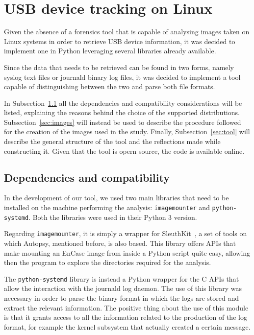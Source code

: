 \documentclass[a4paper,twocolumn]{article}
\begin{document}
\section{USB device tracking on Linux}
\label{sec:contrib}
Given the absence of a forensics tool that is capable of analysing images taken
on Linux systems in order to retrieve USB device information, it was decided to
implement one in Python leveraging several libraries already available.

Since the data that needs to be retrieved can be found in two forms, namely
syslog text files or journald binary log files, it was decided to implement a
tool capable of distinguishing between the two and parse both file formats.

In Subsection~\ref{sec:prems} all the dependencies and compatibility
considerations will be listed, explaining the reasons behind the choice of the
supported distributions. Subsection~\ref{sec:images} will instead be used to
describe the procedure followed for the creation of the images used in the
study. Finally, Subsection~\ref{sec:tool} will describe the general structure of
the tool and the reflections made while constructing it. Given that the tool is
opern source, the code is available online.~\cite{ourtool}

\subsection{Dependencies and compatibility}
\label{sec:prems}
In the development of our tool, we used two main libraries that need
to be installed on the machine performing the analysis:
\texttt{imagemounter} and \texttt{python-systemd}. Both the libraries were used
in their Python 3 version.

Regarding \texttt{imagemounter}, it is simply a wrapper for
SleuthKit~\cite{sleuthkit}, a set of tools on which Autopsy, mentioned before,
is also based.  This library offers APIs that make mounting an EnCase image from
inside a Python script quite easy, allowing then the program to explore the
directories required for the analysis.

The \texttt{python-systemd} library is instead a Python wrapper for the C APIs
that allow the interaction with the journald log daemon. The use of this library
was necessary in order to parse the binary format in which the logs are stored
and extract the relevant information. The positive thing about the use of this
module is that it grants access to all the information related to the production
of the log format, for example the kernel subsystem that actually created a
certain message.
\end{document}
